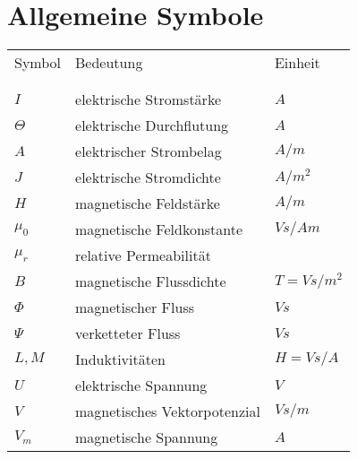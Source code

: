 \section*{Allgemeine Symbole}\label{s.sym.alg}
\begin{flushleft}\begin{tabularx}{\textwidth}{l l X}
Symbol & Bedeutung	& Einheit\\
\\
\hline
\\ 
$I$	& elektrische Stromstärke	&	$A$ \\
$\Theta$	&	elektrische Durchflutung 	&	$A$	\\
$A$			&	elektrischer Strombelag  	&  	$A/m$\\ 
$J$			&	elektrische Stromdichte		&	$A/m^2$ \\	
$H$			&	magnetische Feldstärke		&	$A/m$\\
$\mu_0$		&	magnetische Feldkonstante	&	$Vs/Am$\\
$\mu_r$		&	relative Permeabilität		&	\\
$B$			&	magnetische Flussdichte		&	$T = Vs/m^2$ \\
$\Phi$		&	magnetischer Fluss			&	$Vs$ \\
$\Psi$		&	verketteter Fluss			&	$Vs$ \\
$L, M$		&	Induktivitäten				&	$H = Vs/A$\\
$U$			&	elektrische Spannung		&	$V$ \\
$V$			&	magnetisches Vektorpotenzial&	$Vs/m$\\
$V_m$		&	magnetische Spannung		&	$A$
\end{tabularx}\end{flushleft}
%
\cleardoublepage

%
%
%
%
%
\cleardoublepage
\nocite{*}
\printbibliography

